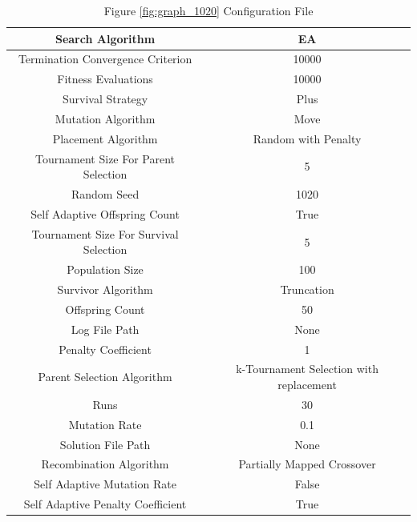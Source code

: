 \documentclass{standalone}
\begin{document}
\begin{table}[!htb]
	\centering
	\caption{Figure \ref{fig:graph_1020} Configuration File}
	\label{tab:graph_1020}
	\begin{tabular}{| c | c |}
		\hline
		Search Algorithm		& EA		 \\
		\hline
		Termination Convergence Criterion		& 10000		 \\
		\hline
		Fitness Evaluations		& 10000		 \\
		\hline
		Survival Strategy		& Plus		 \\
		\hline
		Mutation Algorithm		& Move		 \\
		\hline
		Placement Algorithm		& Random with Penalty		 \\
		\hline
		Tournament Size For Parent Selection		& 5		 \\
		\hline
		Random Seed		& 1020		 \\
		\hline
		Self Adaptive Offspring Count		& True		 \\
		\hline
		Tournament Size For Survival Selection		& 5		 \\
		\hline
		Population Size		& 100		 \\
		\hline
		Survivor Algorithm		& Truncation		 \\
		\hline
		Offspring Count		& 50		 \\
		\hline
		Log File Path		& None		 \\
		\hline
		Penalty Coefficient		& 1		 \\
		\hline
		Parent Selection Algorithm		& k-Tournament Selection with replacement		 \\
		\hline
		Runs		& 30		 \\
		\hline
		Mutation Rate		& 0.1		 \\
		\hline
		Solution File Path		& None		 \\
		\hline
		Recombination Algorithm		& Partially Mapped Crossover		 \\
		\hline
		Self Adaptive Mutation Rate		& False		 \\
		\hline
		Self Adaptive Penalty Coefficient		& True		 \\
		\hline
	\end{tabular}
\end{table}
\end{document}
